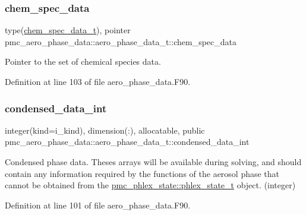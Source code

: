 \subsubsection{\texorpdfstring{chem\+\_\+spec\+\_\+data}{chem\_spec\_data}}
{\footnotesize\ttfamily type(\mbox{\hyperlink{structpmc__chem__spec__data_1_1chem__spec__data__t}{chem\+\_\+spec\+\_\+data\+\_\+t}}), pointer pmc\+\_\+aero\+\_\+phase\+\_\+data\+::aero\+\_\+phase\+\_\+data\+\_\+t\+::chem\+\_\+spec\+\_\+data\hspace{0.3cm}{\ttfamily [private]}}



Pointer to the set of chemical species data. 



Definition at line 103 of file aero\+\_\+phase\+\_\+data.\+F90.

\mbox{\label{structpmc__aero__phase__data_1_1aero__phase__data__t_a4c1266fa3485a8d000082c2dd8b15ee4}} 
\subsubsection{\texorpdfstring{condensed\+\_\+data\+\_\+int}{condensed\_data\_int}}
{\footnotesize\ttfamily integer(kind=i\+\_\+kind), dimension(\+:), allocatable, public pmc\+\_\+aero\+\_\+phase\+\_\+data\+::aero\+\_\+phase\+\_\+data\+\_\+t\+::condensed\+\_\+data\+\_\+int}



Condensed phase data. Theses arrays will be available during solving, and should contain any information required by the functions of the aerosol phase that cannot be obtained from the {\ttfamily \mbox{\hyperlink{structpmc__phlex__state_1_1phlex__state__t}{pmc\+\_\+phlex\+\_\+state\+::phlex\+\_\+state\+\_\+t}}} object. (integer) 



Definition at line 101 of file aero\+\_\+phase\+\_\+data.\+F90.

\mbox{\label{structpmc__aero__phase__data_1_1aero__phase__data__t_ac8b625412bd07cc68a72269bd03c5867}} 
